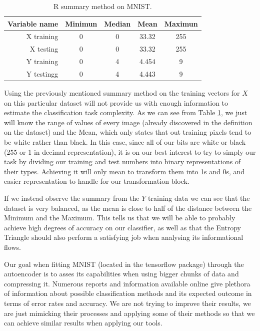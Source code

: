 \documentclass[12pt]{report}
\begin{document}
\begin{table}[H]
	\caption{R summary method on MNIST.}
	\begin{center}
		\label{tab:table_MNIST}
		\begin{tabular}{r|c|c|c|c} %
			\textbf{Variable name} & \textbf{Minimun} & \textbf{Median} & \textbf{Mean} & \textbf{Maximun}\\
			\hline
			X training & 0 & 0 & 33.32 & 255 \\
			X testing  & 0 & 0 & 33.32 & 255 \\
		    Y training & 0 & 4 & 4.454 & 9 \\
		    Y testingg & 0 & 4 & 4.443 & 9 \\
		\end{tabular}
	\end{center}
\end{table}

Using the previously mentioned summary method on the training vectors for $X$ on this particular dataset will not provide us with enough information to estimate the classification task complexity. As we can see from Table \ref{tab:table_MNIST}, we just will know the range of values of every image (already discovered in the definition on the dataset) and the Mean, which only states that out training pixels tend to be white rather than black. In this case, since all of our bits are white or black (255 or 1 in decimal representation), it is on our best interest to try to simply our task by dividing our training and test numbers into binary representations of their types. Achieving it will only mean to transform them into 1s and 0s, and easier representation to handle for our transformation block. \par 

If we instead observe the summary from the $Y$ training data we can see that the dataset is very balanced, as the mean is close to half of the distance between the Minimum and the Maximum. This tells us that we will be able to probably achieve high degrees of accuracy on our classifier, as well as that the Entropy Triangle should also perform a satisfying job when analysing its informational flows.  \par

Our goal when fitting MNIST (located in the tensorflow package) through the autoencoder is to asses its capabilities when using bigger chunks of data and compressing it. Numerous reports and information available online give plethora of information about possible classification methods and its expected outcome in terms of error rates and accuracy. We are not trying to improve their results, we are just mimicking their processes and applying some of their methods so that we can achieve similar results when applying our tools.\par
\end{document}
